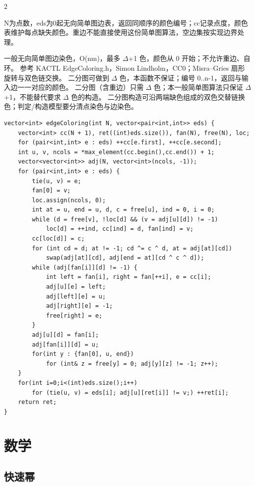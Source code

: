 \documentclass[UTF8,fontset=fandol,a4paper,twoside]{ctexart}
\newcommand{\note}[1]{{\fontsize{10}{12}\selectfont #1\par}}
\begin{document}
\begin{multicols}{2}
\note{N为点数，eds为0起无向简单图边表，返回同顺序的颜色编号；cc记录点度，颜色表维护每点缺失颜色。重边不能直接使用这份简单图算法，空边集按实现边界处理。}
\note{一般无向简单图边染色，O(\allowbreak{}nm)\allowbreak{}，最多 \ensuremath{\Delta}+\allowbreak{}1 色，颜色从 0 开始；不允许重边、自环。 参考 KACTL EdgeColoring.\allowbreak{}h，Simon Lindholm，CC0；Misra–Gries 扇形旋转与双色链交换。 二分图可做到 \ensuremath{\Delta} 色，本函数不保证；编号 0.\allowbreak{}.\allowbreak{}n-\allowbreak{}1，返回与输入边一一对应的颜色。 二分图（含重边）只需 \ensuremath{\Delta} 色；本一般简单图算法只保证 \ensuremath{\Delta}+\allowbreak{}1，不能替代要求 \ensuremath{\Delta} 色的构造。 二分图构造可沿两端缺色组成的双色交替链换色；判定/\allowbreak{}构造模型要分清点染色与边染色。}
\begin{lstlisting}
vector<int> edgeColoring(int N, vector<pair<int,int>> eds) {
    vector<int> cc(N + 1), ret((int)eds.size()), fan(N), free(N), loc;
    for (pair<int,int> e : eds) ++cc[e.first], ++cc[e.second];
    int u, v, ncols = *max_element(cc.begin(),cc.end()) + 1;
    vector<vector<int>> adj(N, vector<int>(ncols, -1));
    for (pair<int,int> e : eds) {
        tie(u, v) = e;
        fan[0] = v;
        loc.assign(ncols, 0);
        int at = u, end = u, d, c = free[u], ind = 0, i = 0;
        while (d = free[v], !loc[d] && (v = adj[u][d]) != -1)
            loc[d] = ++ind, cc[ind] = d, fan[ind] = v;
        cc[loc[d]] = c;
        for (int cd = d; at != -1; cd ^= c ^ d, at = adj[at][cd])
            swap(adj[at][cd], adj[end = at][cd ^ c ^ d]);
        while (adj[fan[i]][d] != -1) {
            int left = fan[i], right = fan[++i], e = cc[i];
            adj[u][e] = left;
            adj[left][e] = u;
            adj[right][e] = -1;
            free[right] = e;
        }
        adj[u][d] = fan[i];
        adj[fan[i]][d] = u;
        for(int y : {fan[0], u, end})
            for (int& z = free[y] = 0; adj[y][z] != -1; z++);
    }
    for(int i=0;i<(int)eds.size();i++)
        for (tie(u, v) = eds[i]; adj[u][ret[i]] != v;) ++ret[i];
    return ret;
}
\end{lstlisting}
\section{数学}
\subsection{快速幂}


\end{multicols}
\end{document}
